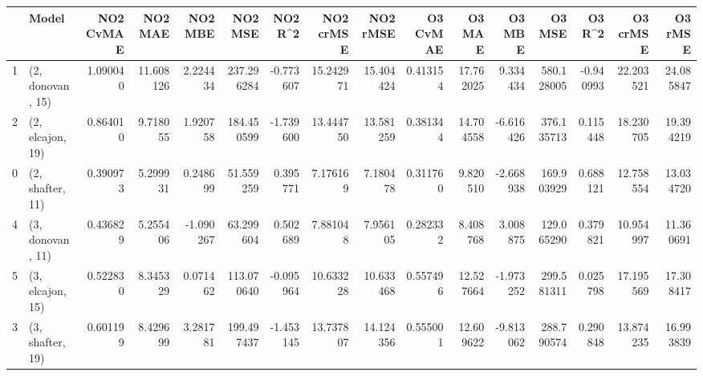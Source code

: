 \begin{tabular}{llrrrrrrrrrrrrrr}
\toprule
{} &             Model &  NO2 CvMAE &    NO2 MAE &   NO2 MBE &     NO2 MSE &   NO2 R\textasciicircum2 &  NO2 crMSE &   NO2 rMSE &  O3 CvMAE &     O3 MAE &    O3 MBE &      O3 MSE &    O3 R\textasciicircum2 &   O3 crMSE &    O3 rMSE \\
\midrule
1 &  (2, donovan, 15) &   1.090040 &  11.608126 &  2.224434 &  237.296284 & -0.773607 &  15.242971 &  15.404424 &  0.413154 &  17.762025 &  9.334434 &  580.128005 & -0.940993 &  22.203521 &  24.085847 \\
2 &  (2, elcajon, 19) &   0.864010 &   9.718055 &  1.920758 &  184.450599 & -1.739600 &  13.444750 &  13.581259 &  0.381344 &  14.704558 & -6.616426 &  376.135713 &  0.115448 &  18.230705 &  19.394219 \\
0 &  (2, shafter, 11) &   0.390973 &   5.299931 &  0.248699 &   51.559259 &  0.395771 &   7.176169 &   7.180478 &  0.311760 &   9.820510 & -2.668938 &  169.903929 &  0.688121 &  12.758554 &  13.034720 \\
4 &  (3, donovan, 11) &   0.436829 &   5.255406 & -1.090267 &   63.299604 &  0.502689 &   7.881048 &   7.956105 &  0.282332 &   8.408768 &  3.008875 &  129.065290 &  0.379821 &  10.954997 &  11.360691 \\
5 &  (3, elcajon, 15) &   0.522830 &   8.345329 &  0.071462 &  113.070640 & -0.095964 &  10.633228 &  10.633468 &  0.557496 &  12.527664 & -1.973252 &  299.581311 &  0.025798 &  17.195569 &  17.308417 \\
3 &  (3, shafter, 19) &   0.601199 &   8.429699 &  3.281781 &  199.497437 & -1.453145 &  13.737807 &  14.124356 &  0.555001 &  12.609622 & -9.813062 &  288.790574 &  0.290848 &  13.874235 &  16.993839 \\
\bottomrule
\end{tabular}
